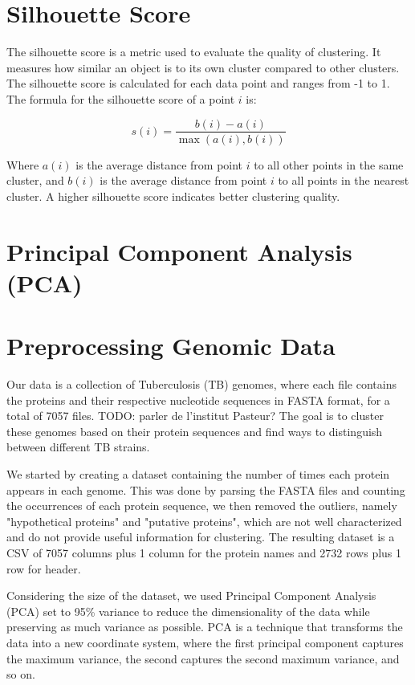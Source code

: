 \section{Silhouette Score}
\label{subsec:silhouette_score}

The silhouette score is a metric used to evaluate the quality of clustering. It measures how similar an object 
is to its own cluster compared to other clusters. The silhouette score is calculated for each data point and
ranges from -1 to 1. The formula for the silhouette score of a point $i$ is:

\begin{equation}
	s(i) = \frac{b(i) - a(i)}{\max(a(i), b(i))}
\end{equation}

Where $a(i)$ is the average distance from point $i$ to all other points in the same cluster, and $b(i)$ is the
average distance from point $i$ to all points in the nearest cluster. A higher silhouette score indicates better 
clustering quality.

\section{Principal Component Analysis (PCA)}
\label{subsec:pca}



\section{Preprocessing Genomic Data}
\label{sec:preprocessing_genomic_data}

Our data is a collection of Tuberculosis (TB) genomes, where each file contains the proteins and their respective
nucleotide sequences in FASTA format, for a total of 7057 files.
TODO: parler de l'institut Pasteur?
The goal is to cluster these genomes based on their protein sequences and find ways to distinguish between different
TB strains.

We started by creating a dataset containing the number of times each protein appears in each genome. This was done by 
parsing the FASTA files and counting the occurrences of each protein sequence, we then removed the outliers, namely
"hypothetical proteins" and "putative proteins", which are not well characterized and do not provide useful information
for clustering. The resulting dataset is a CSV of 7057 columns plus 1 column for the protein names and 2732 rows plus 1
row for header.

Considering the size of the dataset, we used Principal Component Analysis (PCA) set to 95\% variance to reduce the dimensionality
of the data while preserving as much variance as possible. PCA is a technique that transforms the data into a new coordinate 
system, where the first principal component captures the maximum variance, the second captures the second maximum variance, 
and so on.

